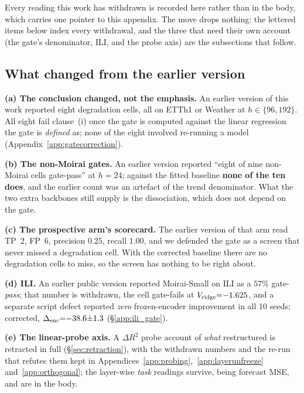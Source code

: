 Every reading this work has withdrawn is recorded here rather than in the body,
which carries one pointer to this appendix.  The move drops nothing: the lettered
items below index every withdrawal, and the three that need their own account (the
gate's denominator, ILI, and the probe axis) are the subsections that follow.

\subsection{What changed from the earlier version}
\label{app:corrections}

\textbf{(a) The conclusion changed, not the emphasis.} An earlier version of this
work reported eight degradation cells, all on ETTh1 or Weather at
$h{\in}\{96,192\}$.  All eight fail clause~(i) once the gate is computed against
the linear regression the gate is \emph{defined} as; none of the eight involved
re-running a model (Appendix~\ref{app:gatecorrection}).

\textbf{(b) The non-Moirai gates.} An earlier version reported ``eight of nine
non-Moirai cells gate-pass'' at $h{=}24$; against the fitted baseline
\textbf{none of the ten does}, and the earlier count was an artefact of the trend
denominator.  What the two extra backbones still supply is the dissociation,
which does not depend on the gate.

\textbf{(c) The prospective arm's scorecard.} The earlier version of that arm read
TP~2, FP~6, precision $0.25$, recall $1.00$, and we defended the gate as a screen
that never missed a degradation cell.  With the corrected baseline there are no
degradation cells to miss, so the screen has nothing to be right about.

\textbf{(d) ILI.} An earlier public version reported Moirai-Small on ILI as a
$57\%$ gate-\emph{pass}; that number is withdrawn, the cell gate-fails at
$V_{\text{ridge}}{=}{-}1.625$, and a separate script defect reported \emph{zero}
frozen-encoder improvement in all 10 seeds; corrected, $\Delta_\text{enc}{=}{-}38.6{\pm}1.3$
(\S\ref{app:ili_gate}).

\textbf{(e) The linear-probe axis.} A $\Delta R^2$ probe account of \emph{what}
restructured is retracted in full (\S\ref{sec:retraction}), with the withdrawn
numbers and the re-run that refutes them kept in
Appendices~\ref{app:probing},~\ref{app:layerunfreeze} and~\ref{app:orthogonal};
the layer-wise \emph{task} readings survive, being forecast MSE, and are in the body.

